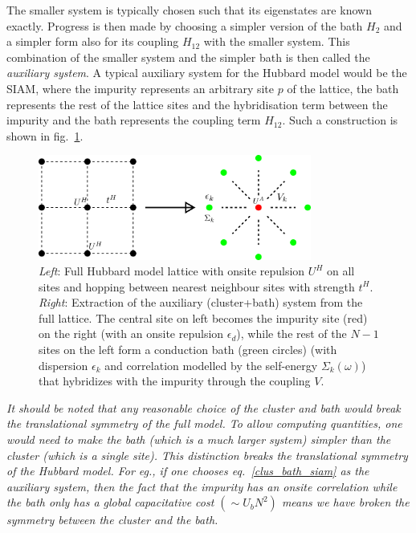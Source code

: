 \documentclass[12pt]{article}
\numberwithin{equation}{section}
\begin{document}
The smaller system is typically chosen such that its eigenstates are known exactly.
Progress is then made by choosing a simpler version of the bath \(H_2\) and a simpler form also for its coupling \(H_{12}\) with the smaller system.
This combination of the smaller system and the simpler bath is then called the \textit{auxiliary system}.
A typical auxiliary system for the Hubbard model would be the SIAM, where the impurity represents an arbitrary site \(p\) of the lattice, the bath represents the rest of the lattice sites and the hybridisation term between the impurity and the bath represents the coupling term \(H_{12}\).
Such a construction is shown in fig.~\ref{cluster-bath}.
\begin{figure}[htpb!]
	\centering
	\includegraphics[width=0.8\textwidth]{./cluster-bath.png}
	\caption{\textit{Left}: Full Hubbard model lattice with onsite repulsion $U^H$ on all sites and hopping between nearest neighbour sites with strength $t^H$. \textit{Right}: Extraction of the auxiliary (cluster+bath) system from the full lattice. The central site on left becomes the impurity site (red) on the right (with an onsite repulsion $\epsilon_d$), while the rest of the $N-1$ sites on the left form a conduction bath (green circles) (with dispersion $\epsilon_k$ and correlation modelled by the self-energy $\Sigma_k(\omega)$) that hybridizes with the impurity through the coupling $V$.}
	\label{cluster-bath}
\end{figure}
\textit{It should be noted that any reasonable choice of the cluster and bath would break the translational symmetry of the full model. To allow computing quantities, one would need to make the bath (which is a much larger system) simpler than the cluster (which is a single site). This distinction breaks the translational symmetry of the Hubbard model. For eg., if one chooses eq.~\ref{clus_bath_siam} as the auxiliary system, then the fact that the impurity has an onsite correlation while the bath only has a global capacitative cost $(\sim U_b N^2)$ means we have broken the symmetry between the cluster and the bath.}
\end{document}
